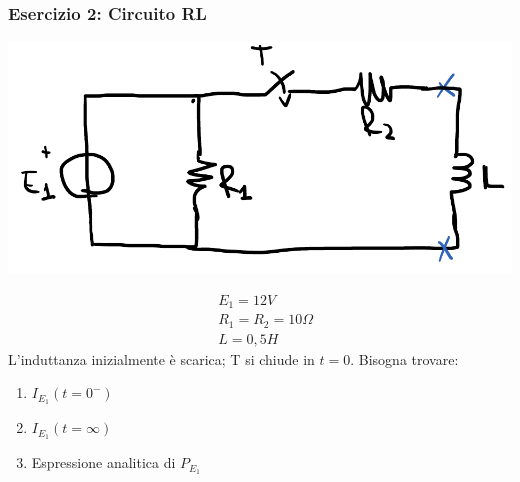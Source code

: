 \documentclass{article}
\begin{document}
\subsubsection{Esercizio 2: Circuito RL}
\begin{center}
    \includegraphics[scale=0.4]{Image/Es_2_Trans_0.png}
\end{center}
\begin{align*}
    &E_1 = 12V\\
    &R_1 = R_2 = 10 \Omega\\
    &L = 0,5 H
\end{align*}
L'induttanza inizialmente è scarica; T si chiude in $t=0$.
Bisogna trovare:
\begin{enumerate}
    \item $I_{E_1}(t=0^-)$
    \item $I_{E_1}(t=\infty)$
    \item Espressione analitica di $P_{E_1}$
\end{enumerate}
\end{document}
